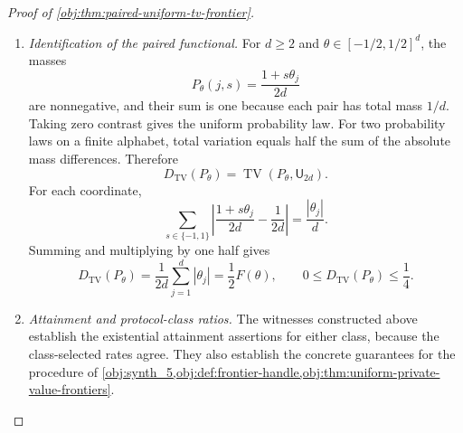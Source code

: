\documentclass[11pt]{article}
\begin{document}
\begin{proof}[Proof of \cref{obj:thm:paired-uniform-tv-frontier}]
\begin{enumerate}
The construction belongs to both protocol classes. Its interval, being contained in \([0,1/4]\), is also an admissible interval in the optimization over \([0,1]\).
Taking the corresponding candidates in the minimax infima gives, for either \(\mathcal C\),
\[
\mathfrak R^{\mathrm{TV}}_{\mathcal C}
(\mathcal P_d^{\mathrm{pair}};n,d,\varepsilon)
\le C_0\rho(t,d),
\qquad
\mathfrak H^{\mathrm{TV}}_{\mathcal C}
(\mathcal P_d^{\mathrm{pair}};n,d,\varepsilon)
\le C_0\sqrt{\rho(t,d)}.
\]
Since \(c\le c_{\mathrm{lower}}\) and both rates are nonnegative, the lower bounds proved above give
\[
\begin{aligned}
c\rho(t,d)
&\le\mathfrak R^{\mathrm{TV}}_{\mathcal C}
(\mathcal P_d^{\mathrm{pair}};n,d,\varepsilon)
\le C_0\rho(t,d),\\
c\sqrt{\rho(t,d)}
&\le\mathfrak H^{\mathrm{TV}}_{\mathcal C}
(\mathcal P_d^{\mathrm{pair}};n,d,\varepsilon)
\le C_0\sqrt{\rho(t,d)}.
\end{aligned}
\]

\item \textit{Identification of the paired functional.}
For \(d\ge2\) and \(\theta\in[-1/2,1/2]^d\), the masses
\[
P_\theta(j,s)=\frac{1+s\theta_j}{2d}
\]
are nonnegative, and their sum is one because each pair has total mass \(1/d\).
Taking zero contrast gives the uniform probability law.
For two probability laws on a finite alphabet, total variation equals half the sum of the absolute mass differences. Therefore
\[
D_{\mathrm{TV}}(P_\theta)
=\operatorname{TV}(P_\theta,\mathsf U_{2d}).
\]
For each coordinate,
\[
\sum_{s\in\{-1,1\}}
\left|\frac{1+s\theta_j}{2d}-\frac1{2d}\right|
=
\frac{|\theta_j|}{d}.
\]
Summing and multiplying by one half gives
\[
D_{\mathrm{TV}}(P_\theta)
=\frac1{2d}\sum_{j=1}^d|\theta_j|
=\frac12F(\theta),
\qquad
0\le D_{\mathrm{TV}}(P_\theta)\le\frac14.
\]

\item \textit{Attainment and protocol-class ratios.}
The witnesses constructed above establish the existential attainment assertions for either class, because the class-selected rates agree. They also establish the concrete guarantees for the procedure of
\cref{obj:synth_5,obj:def:frontier-handle,obj:thm:uniform-private-value-frontiers}.


\end{enumerate}
\end{proof}
\end{document}
